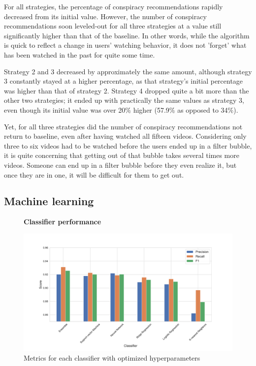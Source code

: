 \documentclass[../main.tex]{subfiles}
\begin{document}
For all strategies, the percentage of conspiracy recommendations rapidly decreased from its initial value. 
However, the number of conspiracy recommendations soon leveled-out for all three strategies at a value still 
significantly higher than that of the baseline. In other words, while the algorithm is quick to reflect a change
in users' watching behavior, it does not 'forget' what has been watched in the past for quite some time. 

Strategy 2 and 3 decreased by approximately the same amount, although strategy 3 constantly stayed at a
higher percentage, as that strategy's initial percentage was higher than that of strategy 2. Strategy 4 dropped
quite a bit more than the other two strategies; it ended up with practically the same values as strategy 3, even
though its initial value was over 20\% higher (57.9\% as opposed to 34\%). 

Yet, for all three strategies did the number of conspiracy recommendations not return to baseline, even after 
having watched all fifteen videos. Considering only three to six videos had to be watched before the users ended
up in a filter bubble, it is quite concerning that getting out of that bubble takes several times more videos. 
Someone can end up in a filter bubble before they even realize it, but once they are in one, it will be 
difficult for them to get out. 

\subsection{Machine learning} \label{ML_results}

\begin{figure}
  \textbf{Classifier performance}\par\medskip
  \centering
  \includegraphics[keepaspectratio, width=\textwidth]{images/classifier_results.pdf}
  \caption{Metrics for each classifier with optimized hyperparameters}
  \label{fig:ML_scores}
\end{figure}
\end{document}
